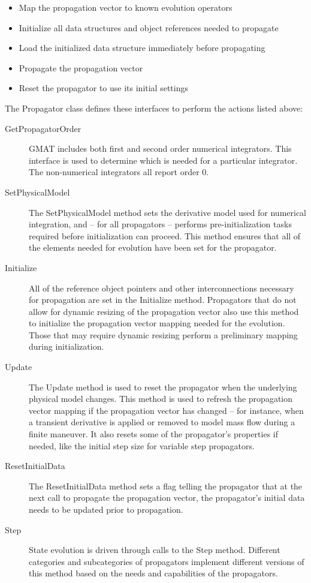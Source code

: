 \begin{itemize}
\item Map the propagation vector to known evolution operators
\item Initialize all data structures and object references needed to propagate
\item Load the initialized data structure immediately before propagating
\item Propagate the propagation vector
\item Reset the propagator to use its initial settings
\end{itemize}

\noindent The Propagator class defines these interfaces to perform the actions listed above:

\begin{description}
\item[GetPropagatorOrder]  GMAT includes both first and second order numerical integrators.  This
interface is used to determine which is needed for a particular integrator.  The non-numerical
integrators all report order 0.
\item[SetPhysicalModel]  The SetPhysicalModel method sets the derivative model used for numerical
integration, and -- for all propagators -- performs pre-initialization tasks required before
initialization can proceed.  This method ensures that all of the elements needed for evolution have
been set for the propagator.
\item[Initialize]  All of the reference object pointers and other interconnections necessary for
propagation are set in the Initialize method.  Propagators that do not allow for dynamic resizing of
the propagation vector also use this method to initialize the propagation vector mapping needed for
the evolution.  Those that may require dynamic resizing perform a preliminary mapping during
initialization.
\item[Update]  The Update method is used to reset the propagator when the underlying physical model
changes.  This method is used to refresh the propagation vector mapping if the propagation vector
has changed -- for instance, when a transient derivative is applied or removed to model mass flow
during a finite maneuver.  It also resets some of the propagator's properties if needed, like the
initial step size for variable step propagators.
\item[ResetInitialData]  The ResetInitialData method sets a flag telling the propagator that at the
next call to propagate the propagation vector, the propagator's initial data needs to be updated
prior to propagation.
\item[Step]  State evolution is driven through calls to the Step method.  Different categories and
subcategories of propagators implement different versions of this method based on the needs and
capabilities of the propagators.
\end{description}

